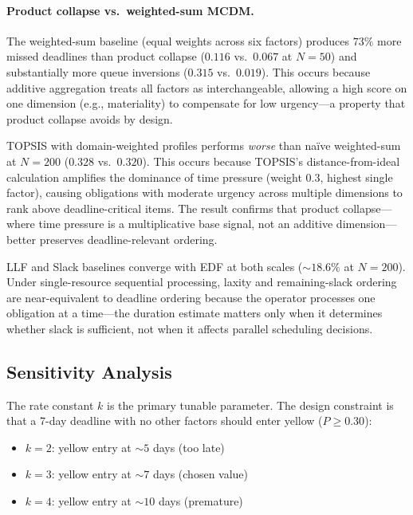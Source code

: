 \documentclass[11pt]{article}
\begin{document}
\paragraph{Product collapse vs.\ weighted-sum MCDM.}
The weighted-sum baseline (equal weights across six factors) produces
$73\%$ more missed deadlines than product collapse ($0.116$ vs.\
$0.067$ at $N{=}50$) and substantially more queue inversions
($0.315$ vs.\ $0.019$).
This occurs because additive aggregation treats all factors as
interchangeable, allowing a high score on one dimension (e.g.,
materiality) to compensate for low urgency---a property that
product collapse avoids by design.

TOPSIS with domain-weighted profiles performs \emph{worse} than
naïve weighted-sum at $N{=}200$ ($0.328$ vs.\ $0.320$).  This
occurs because TOPSIS's distance-from-ideal calculation amplifies
the dominance of time pressure (weight $0.3$, highest single
factor), causing obligations with moderate urgency across
multiple dimensions to rank above deadline-critical items.
The result confirms that product collapse---where time pressure
is a multiplicative base signal, not an additive
dimension---better preserves deadline-relevant ordering.

LLF and Slack baselines converge with EDF at both scales
(${\sim}18.6\%$ at $N{=}200$).  Under single-resource sequential
processing, laxity and remaining-slack ordering are near-equivalent
to deadline ordering because the operator processes one obligation
at a time---the duration estimate matters only when it determines
whether slack is sufficient, not when it affects parallel
scheduling decisions.

\subsection{Sensitivity Analysis}
\label{sec:sensitivity}

The rate constant $k$ is the primary tunable parameter.
The design constraint is that a 7-day deadline with no other
factors should enter yellow ($P \geq 0.30$):

\begin{itemize}[nosep]
  \item $k = 2$: yellow entry at ${\sim}5$ days (too late)
  \item $k = 3$: yellow entry at ${\sim}7$ days (chosen value)
  \item $k = 4$: yellow entry at ${\sim}10$ days (premature)
\end{itemize}
\end{document}
